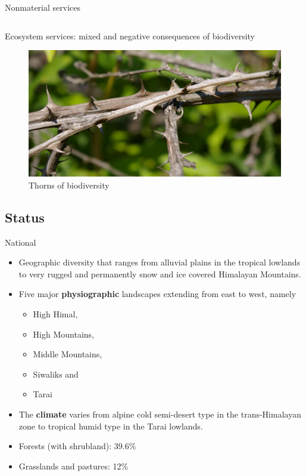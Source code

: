 \documentclass[
  ignorenonframetext,
  aspectratio=169]{beamer}
\providecommand{\tightlist}{%
  \setlength{\itemsep}{0pt}\setlength{\parskip}{0pt}}
\begin{document}
\begin{frame}{Nonmaterial services}
\begin{columns}[T,totalwidth=\textwidth]
\end{columns}
\end{frame}

\begin{frame}{Ecosystem services: mixed and negative consequences of
biodiversity}
\protect\hypertarget{ecosystem-services-mixed-and-negative-consequences-of-biodiversity}{}
\begin{figure}
\includegraphics[width=0.55\linewidth]{./../images/biodiversity_thorns} \caption{Thorns of biodiversity}\label{fig:biodiversity-thorns}
\end{figure}
\end{frame}

\hypertarget{status}{%
\subsection{Status}\label{status}}

\begin{frame}{National}
\protect\hypertarget{national}{}
\begin{itemize}
\tightlist
\item
  Geographic diversity that ranges from alluvial plains in the tropical
  lowlands to very rugged and permanently snow and ice covered Himalayan
  Mountains.
\item
  Five major \textbf{physiographic} landscapes extending from east to
  west, namely

  \begin{itemize}
  \tightlist
  \item
    High Himal,
  \item
    High Mountains,
  \item
    Middle Mountains,
  \item
    Siwaliks and
  \item
    Tarai
  \end{itemize}
\item
  The \textbf{climate} varies from alpine cold semi-desert type in the
  trans-Himalayan zone to tropical humid type in the Tarai lowlands.
\item
  Forests (with shrubland): 39.6\%
\item
  Grasslands and pastures: 12\%
\end{itemize}
\end{frame}
\end{document}
